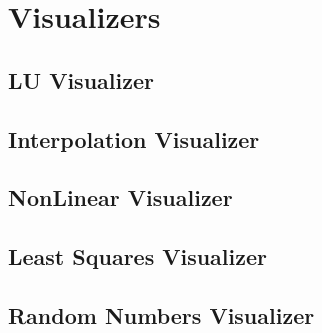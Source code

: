 \section*{Visualizers}
\subsection*{LU Visualizer}


\subsection*{Interpolation Visualizer}


\subsection*{NonLinear Visualizer}






\subsection*{Least Squares Visualizer}


\subsection*{Random Numbers Visualizer}

